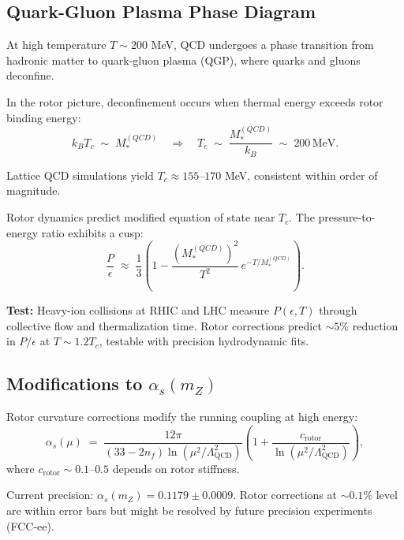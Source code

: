 \documentclass[11pt,a4paper]{article}
\theoremstyle{definition}
\theoremstyle{plain}
\theoremstyle{remark}
\begin{document}
\subsection{Quark-Gluon Plasma Phase Diagram}

At high temperature $T \sim 200$ MeV, QCD undergoes a phase transition from hadronic matter to quark-gluon plasma (QGP), where quarks and gluons deconfine.

In the rotor picture, deconfinement occurs when thermal energy exceeds rotor binding energy:
\begin{equation}
k_B T_c \;\sim\; M_*^{(QCD)} \quad\Rightarrow\quad T_c \;\sim\; \frac{M_*^{(QCD)}}{k_B} \;\sim\; 200\,\text{MeV}.
\end{equation}

Lattice QCD simulations yield $T_c \approx 155$--$170$ MeV, consistent within order of magnitude.

Rotor dynamics predict modified equation of state near $T_c$. The pressure-to-energy ratio exhibits a cusp:
\begin{equation}
\frac{P}{\epsilon} \;\approx\; \frac{1}{3}\left(1 - \frac{(M_*^{(QCD)})^2}{T^2}\,e^{-T/M_*^{(QCD)}}\right).
\end{equation}

\textbf{Test:} Heavy-ion collisions at RHIC and LHC measure $P(\epsilon,T)$ through collective flow and thermalization time. Rotor corrections predict $\sim 5\%$ reduction in $P/\epsilon$ at $T \sim 1.2 T_c$, testable with precision hydrodynamic fits.

\subsection{Modifications to $\alpha_s(m_Z)$}

Rotor curvature corrections modify the running coupling at high energy:
\begin{equation}
\alpha_s(\mu) \;=\; \frac{12\pi}{(33-2n_f)\ln(\mu^2/\Lambda_{\mathrm{QCD}}^2)}\left(1 + \frac{c_{\mathrm{rotor}}}{\ln(\mu^2/\Lambda_{\mathrm{QCD}}^2)}\right),
\end{equation}
where $c_{\mathrm{rotor}} \sim 0.1$--$0.5$ depends on rotor stiffness.

Current precision: $\alpha_s(m_Z) = 0.1179 \pm 0.0009$. Rotor corrections at $\sim 0.1\%$ level are within error bars but might be resolved by future precision experiments (FCC-ee).

\vspace{1em}
\end{document}
